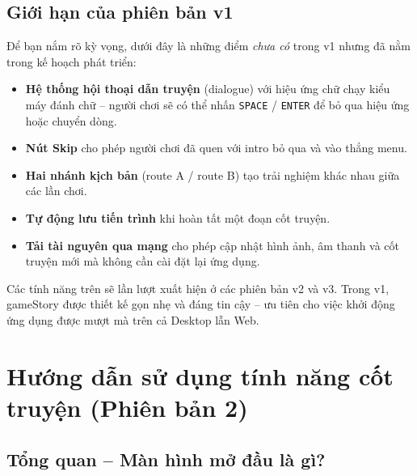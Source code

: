 \documentclass[12pt,a4paper]{article}
\begin{document}
\subsection{Giới hạn của phiên bản v1}
Để bạn nắm rõ kỳ vọng, dưới đây là những điểm \emph{chưa có} trong v1 nhưng đã nằm trong kế hoạch phát triển:
\begin{itemize}
    \item \textbf{Hệ thống hội thoại dẫn truyện} (dialogue) với hiệu ứng chữ chạy kiểu máy đánh chữ -- người chơi sẽ có thể nhấn \texttt{SPACE} / \texttt{ENTER} để bỏ qua hiệu ứng hoặc chuyển dòng.
    \item \textbf{Nút Skip} cho phép người chơi đã quen với intro bỏ qua và vào thẳng menu.
    \item \textbf{Hai nhánh kịch bản} (route A / route B) tạo trải nghiệm khác nhau giữa các lần chơi.
    \item \textbf{Tự động lưu tiến trình} khi hoàn tất một đoạn cốt truyện.
    \item \textbf{Tải tài nguyên qua mạng} cho phép cập nhật hình ảnh, âm thanh và cốt truyện mới mà không cần cài đặt lại ứng dụng.
\end{itemize}
Các tính năng trên sẽ lần lượt xuất hiện ở các phiên bản v2 và v3. Trong v1, gameStory được thiết kế gọn nhẹ và đáng tin cậy -- ưu tiên cho việc khởi động ứng dụng được mượt mà trên cả Desktop lẫn Web.


\newpage
\section{Hướng dẫn sử dụng tính năng cốt truyện (Phiên bản 2)}

\noindent{}
\vspace{8pt}

\subsection{Tổng quan -- Màn hình mở đầu là gì?}
\end{document}
